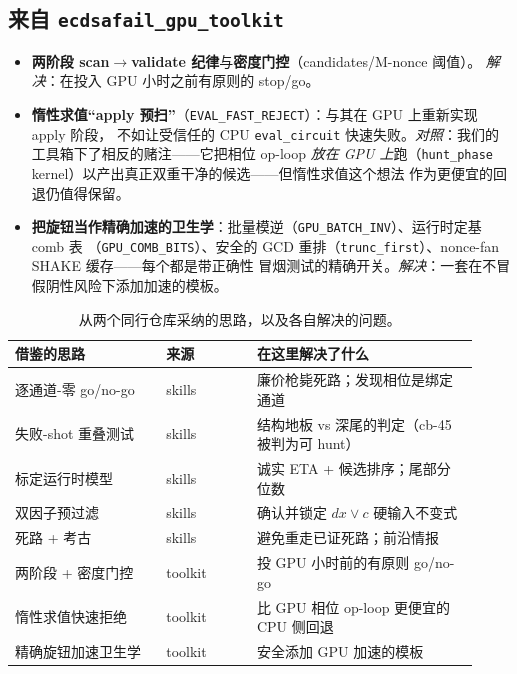 \documentclass[11pt]{ctexart}
\let\c\lstinline
\begin{document}
\subsection{来自 \texttt{ecdsafail\_gpu\_toolkit}}
\begin{itemize}[nosep]
  \item \textbf{两阶段 scan$\to$validate 纪律}与\textbf{密度门控}（candidates/M-nonce 阈值）。
  \emph{解决}：在投入 GPU 小时之前有原则的 stop/go。
  \item \textbf{惰性求值``apply 预扫''}（\c{EVAL_FAST_REJECT}）：与其在 GPU 上重新实现 apply 阶段，
  不如让受信任的 CPU \c{eval_circuit} 快速失败。\emph{对照}：我们的工具箱下了相反的赌注——它把相位
  op-loop \emph{放在 GPU 上}跑（\c{hunt_phase} kernel）以产出真正双重干净的候选——但惰性求值这个想法
  作为更便宜的回退仍值得保留。
  \item \textbf{把旋钮当作精确加速的卫生学}：批量模逆（\c{GPU_BATCH_INV}）、运行时定基 comb 表
  （\c{GPU_COMB_BITS}）、安全的 GCD 重排（\c{trunc_first}）、nonce-fan SHAKE 缓存——每个都是带正确性
  冒烟测试的精确开关。\emph{解决}：一套在不冒假阴性风险下添加加速的模板。
\end{itemize}

\begin{table}[h]\centering\small
\begin{tabular}{@{}p{0.30\linewidth}p{0.18\linewidth}p{0.44\linewidth}@{}}
\toprule
借鉴的思路 & 来源 & 在这里解决了什么 \\ \midrule
逐通道-零 go/no-go & skills & 廉价枪毙死路；发现相位是绑定通道 \\
失败-shot 重叠测试 & skills & 结构地板 vs 深尾的判定（cb-45 被判为可 hunt） \\
标定运行时模型 & skills & 诚实 ETA + 候选排序；尾部分位数 \\
双因子预过滤 & skills & 确认并锁定 $dx \lor c$ 硬输入不变式 \\
死路 + 考古 & skills & 避免重走已证死路；前沿情报 \\
两阶段 + 密度门控 & toolkit & 投 GPU 小时前的有原则 go/no-go \\
惰性求值快速拒绝 & toolkit & 比 GPU 相位 op-loop 更便宜的 CPU 侧回退 \\
精确旋钮加速卫生学 & toolkit & 安全添加 GPU 加速的模板 \\
\bottomrule
\end{tabular}
\caption{从两个同行仓库采纳的思路，以及各自解决的问题。}
\label{tab:borrow}
\end{table}
\end{document}
